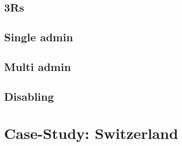 \documentclass[a4paper, twocolumn]{scrartcl}
\begin{document}
\subsection{3Rs}
\subsection{Single admin}
\subsection{Multi admin}
\subsection{Disabling}

\section{Case-Study: Switzerland}

\nocite{*}


\end{document}
